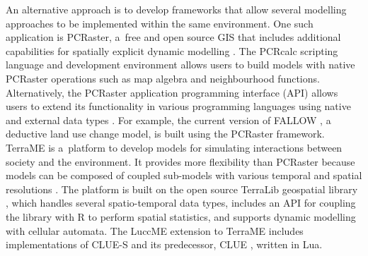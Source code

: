 \documentclass[gmdd, online, hvmath]{copernicus}
\begin{document}
An alternative approach is to develop frameworks that allow several modelling approaches to be implemented within the same environment. One such application is PCRaster, a~free and open source GIS that includes additional capabilities for spatially explicit dynamic modelling \citep{schmitz2009}. The PCRcalc scripting language and development environment allows users to build models with native PCRaster operations such as map algebra and neighbourhood functions. Alternatively, the PCRaster application programming interface (API) allows users to extend its functionality in various programming languages using native and external data types \citep{schmitz2009}. For example, the current version of FALLOW \citep{vannoordwijk2002,mulia2014}, a deductive land use change model, is built using the PCRaster framework. TerraME \citep{carneiro2013} is a~platform to develop models for simulating interactions between society and the environment. It provides more flexibility than PCRaster because models can be composed of coupled sub-models with various temporal and spatial resolutions \citep{moreira2009,carneiro2013}. The platform is built on the open source TerraLib geospatial library \citep{camara2008}, which handles several spatio-temporal data types, includes an API for coupling the library with R \citep{R2014} to perform spatial statistics, and supports dynamic modelling with cellular automata. The LuccME extension to TerraME includes implementations of CLUE-S and its predecessor, CLUE \citep{veldkamp1996,verburg1999}, written in Lua. \\
\end{document}
